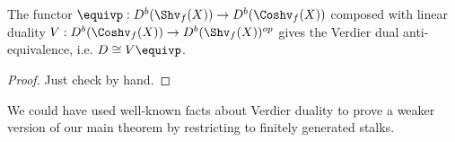 \begin{prop}
	The functor $\equivp:D^b(\Shv_f(X))\to D^b(\Coshv_f(X))$ composed with linear duality $V:D^b(\Coshv_f(X))\to D^b(\Shv_f(X))^{op}$ gives the Verdier dual anti-equivalence, i.e. $D\cong V\equivp$.
\end{prop}
\begin{proof}
Just check by hand.
\end{proof}

\begin{rmk}
We could have used well-known facts about Verdier duality to prove a weaker version of our main theorem by restricting to finitely generated stalks.
\end{rmk}
